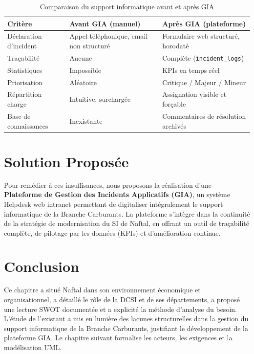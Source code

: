 \begin{table}[H]
\centering
\begin{tabular}{@{}p{4cm}p{4cm}p{4cm}@{}}
\toprule
\textbf{Critère} & \textbf{Avant GIA (manuel)} & \textbf{Après GIA (plateforme)} \\
\midrule
Déclaration d'incident & Appel téléphonique, email non structuré & Formulaire web structuré, horodaté \\
Traçabilité & Aucune & Complète (\texttt{incident\_logs}) \\
Statistiques & Impossible & KPIs en temps réel \\
Priorisation & Aléatoire & Critique / Majeur / Mineur \\
Répartition charge & Intuitive, surchargée & Assignation visible et forçable \\
Base de connaissances & Inexistante & Commentaires de résolution archivés \\
\bottomrule
\end{tabular}
\caption{Comparaison du support informatique avant et après GIA}
\label{tab:avant_apres_gia}
\end{table}

\section{Solution Proposée}
Pour remédier à ces insuffisances, nous proposons la réalisation d'une
\textbf{Plateforme de Gestion des Incidents Applicatifs (GIA)}, un système Helpdesk
web intranet permettant de digitaliser intégralement le support informatique de la Branche
Carburants. La plateforme s'intègre dans la continuité de la stratégie de modernisation
du SI de Naftal, en offrant un outil de traçabilité complète, de pilotage par les données
(KPIs) et d'amélioration continue.

\section{Conclusion}
Ce chapitre a situé Naftal dans son environnement économique et organisationnel, a détaillé le
rôle de la DCSI et de ses départements, a proposé une lecture SWOT documentée et a explicité la
méthode d'analyse du besoin. L'étude de l'existant a mis en lumière des lacunes structurelles dans
la gestion du support informatique de la Branche Carburants, justifiant le développement de la
plateforme GIA. Le chapitre suivant formalise les acteurs, les exigences et la modélisation UML.
